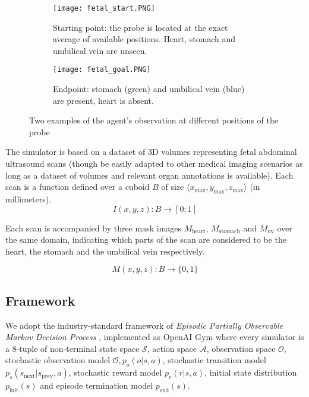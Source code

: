 \begin{figure*}
    \centering
    \begin{subfigure}{.45\linewidth}
      \centering
      \texttt{[image: fetal\_start.PNG]}
      \caption{Starting point: the probe is located at the exact average of available positions. Heart, stomach and umbilical vein are unseen.}
      \label{fig:img-before}
    \end{subfigure}%
    \begin{subfigure}{.45\linewidth}
      \centering
      \texttt{[image: fetal\_goal.PNG]}
      \caption{Endpoint: stomach (green) and umbilical vein (blue) are present, heart is absent.}
      \label{fig:img-after}
    \end{subfigure}
    \caption{Two examples of the agent's observation at different positions of the probe}
    \label{fig:imgs}
\end{figure*}

The simulator is based on a dataset of 3D volumes representing fetal abdominal ultrasound scans (though be easily adapted to other medical imaging scenarios as long as a dataset of volumes and relevant organ annotations is available).
Each scan is a function defined over a cuboid $B$ of size $\langle x_\text{max},y_\text{max},z_\text{max} \rangle$ (in millimeters).
\begin{equation}
    I(x,y,z): B \rightarrow [0;1]
\end{equation}

Each scan is accompanied by three mask images $M_\text{heart}$, $M_\text{stomach}$ and $M_\text{uv}$ over the same domain, indicating which parts of the scan are considered to be the heart, the stomach and the umbilical vein respectively.

\begin{equation}
    M(x,y,z): B \rightarrow \{0,1\}
\end{equation}

\subsection{Framework}

We adopt the industry-standard framework of {\em Episodic Partially Observable Markov Decision Process} \cite{pomdp}, implemented as OpenAI Gym \cite{gym} where every simulator is a 8-tuple of non-terminal state space $\mathcal{S}$, action space $\mathcal{A}$, observation space $\mathcal{O}$, stochastic observation model $\mathcal{O}, p_o(o | s, a)$, stochastic transition model $p_s(s_\text{next} | s_\text{prev}, a)$, stochastic reward model $p_r(r | s, a)$, initial state distribution $p_\text{init}(s)$ and episode termination model $p_\text{end}(s)$.


